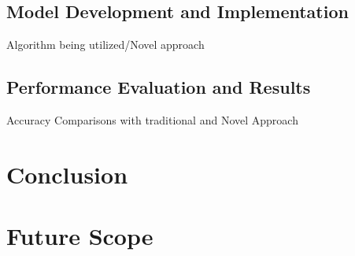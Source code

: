 \section{Model Development and Implementation}
Algorithm being utilized/Novel approach
\section{Performance Evaluation and Results}
Accuracy Comparisons with traditional and Novel Approach
\chapter{Conclusion}
\chapter{Future Scope}

